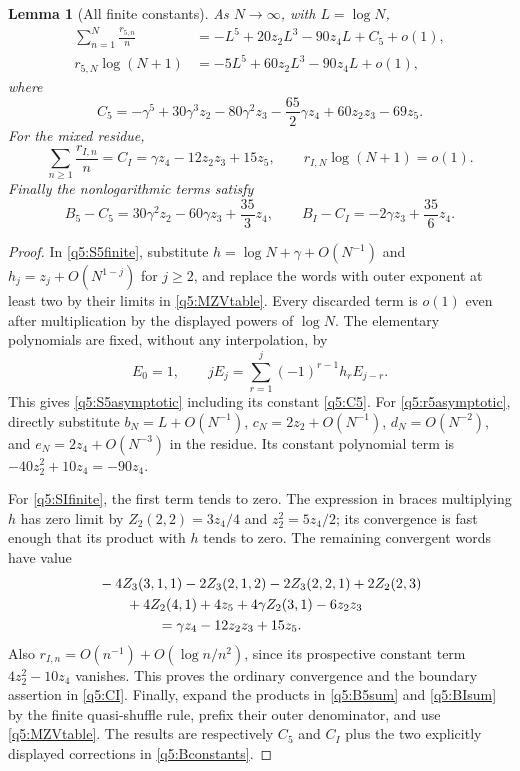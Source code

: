 \documentclass[11pt,a4paper]{article}
\numberwithin{equation}{section}
\newtheorem{lemma}[theorem]{Lemma}
\theoremstyle{definition}
\begin{document}
\begin{lemma}[All finite constants]
\label{q5:constants}
As $N\to\infty$, with $L=\log N$,
\begin{align}
 \sum_{n=1}^N\frac{r_{5,n}}n
   &=-L^5+20z_2L^3-90z_4L+C_5+o(1),
   \label{q5:S5asymptotic}\\
 r_{5,N}\log(N+1)
   &=-5L^5+60z_2L^3-90z_4L+o(1),
   \label{q5:r5asymptotic}
\end{align}
where
\begin{equation}\label{q5:C5}
 C_5=-\gamma^5+30\gamma^3z_2-80\gamma^2z_3
         -\frac{65}{2}\gamma z_4+60z_2z_3-69z_5.
\end{equation}
For the mixed residue,
\begin{equation}\label{q5:CI}
 \sum_{n\geq1}\frac{r_{I,n}}n
      =C_I=\gamma z_4-12z_2z_3+15z_5,
 \qquad r_{I,N}\log(N+1)=o(1).
\end{equation}
Finally the nonlogarithmic terms satisfy
\begin{equation}\label{q5:Bconstants}
 B_5-C_5=30\gamma^2z_2-60\gamma z_3+\frac{35}{3}z_4,
 \qquad
 B_I-C_I=-2\gamma z_3+\frac{35}{6}z_4.
\end{equation}
\end{lemma}
\begin{proof}
In \eqref{q5:S5finite}, substitute
$h=\log N+\gamma+O(N^{-1})$ and
$h_j=z_j+O(N^{1-j})$ for $j\geq2$, and replace the words with
outer exponent at least two by their limits in
\eqref{q5:MZVtable}.  Every discarded term is $o(1)$ even after
multiplication by the displayed powers of $\log N$.
The elementary polynomials are fixed, without any interpolation, by
\[
 E_0=1,\qquad
 jE_j=\sum_{r=1}^j(-1)^{r-1}h_rE_{j-r}.
\]
This gives \eqref{q5:S5asymptotic} including its constant
\eqref{q5:C5}.  For \eqref{q5:r5asymptotic}, directly substitute
$b_N=L+O(N^{-1})$, $c_N=2z_2+O(N^{-1})$,
$d_N=O(N^{-2})$, and $e_N=2z_4+O(N^{-3})$ in the residue.
Its constant polynomial term is
$-40z_2^2+10z_4=-90z_4$.

For \eqref{q5:SIfinite}, the first term tends to zero.  The expression
in braces multiplying $h$ has zero limit by
$Z_2(2,2)=3z_4/4$ and $z_2^2=5z_4/2$; its convergence is fast
enough that its product with $h$ tends to zero.  The remaining convergent
words have value
\begin{align*}
 &-4Z_3(3,1,1)-2Z_3(2,1,2)-2Z_3(2,2,1)+2Z_2(2,3)\\
 &\qquad+4Z_2(4,1)+4z_5+4\gamma Z_2(3,1)-6z_2z_3\\
 &\hspace{15mm}=\gamma z_4-12z_2z_3+15z_5.
\end{align*}
Also $r_{I,n}=O(n^{-1})+O(\log n/n^2)$, since its prospective
constant term $4z_2^2-10z_4$ vanishes.  This proves the ordinary
convergence and the boundary assertion in \eqref{q5:CI}.
Finally, expand the products in \eqref{q5:B5sum} and
\eqref{q5:BIsum} by the finite quasi-shuffle rule, prefix their
outer denominator, and use \eqref{q5:MZVtable}.
The results are respectively $C_5$ and $C_I$ plus the two explicitly
displayed corrections in \eqref{q5:Bconstants}.
\end{proof}
\end{document}

